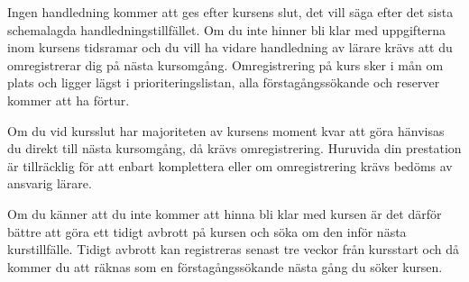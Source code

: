 \documentclass[a4paper,logo]{miunart}
\begin{document}
Ingen handledning kommer att ges efter kursens slut, det vill säga efter det 
sista schemalagda handledningstillfället.
Om du inte hinner bli klar med uppgifterna inom kursens tidsramar och du vill 
ha vidare handledning av lärare krävs att du omregistrerar dig på nästa 
kursomgång.
Omregistrering på kurs sker i mån om plats och ligger lägst i
prioriteringslistan, alla förstagångssökande och reserver kommer att ha förtur.

Om du vid kursslut har majoriteten av kursens moment kvar att göra hänvisas du 
direkt till nästa kursomgång, då krävs omregistrering.
Huruvida din prestation är tillräcklig för att enbart komplettera eller om 
omregistrering krävs bedöms av ansvarig lärare.

Om du känner att du inte kommer att hinna bli klar med kursen är det därför 
bättre att göra ett tidigt avbrott på kursen och söka om den inför nästa 
kurstillfälle.
Tidigt avbrott kan registreras senast tre veckor från kursstart och då kommer 
du att räknas som en förstagångssökande nästa gång du söker kursen.


\printbibliography
\end{document}
